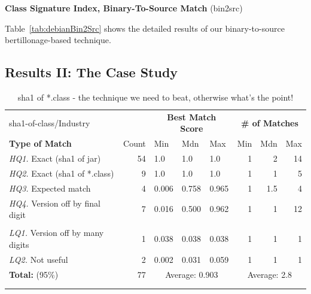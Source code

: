 \textbf{Class Signature Index, Binary-To-Source Match} (bin2src)

Table~\ref{tab:debianBin2Src} shows the detailed results of our binary-to-source
bertillonage-based technique.




\subsection{Results II:  The Case Study}


\begin{table}[h]
  \centering
\begin{tabular}[htbp]{l|r|lll|rrr}
  sha1-of-class/Industry     &              & \multicolumn{3}{c|}{\textbf{Best Match Score}}  & \multicolumn{3}{c}{\textbf{\# of Matches}} \\
  \textbf{Type of Match}     & Count        & Min   & Mdn    & Max   & Min  & Mdn  & Max  \\
  \hline
  \emph{HQ1.} Exact (sha1 of jar)        & 54           & 1.0   & 1.0    & 1.0   & 1    & 2    & 14   \\
  \emph{HQ2.} Exact (sha1 of *.class)    &  9           & 1.0   & 1.0    & 1.0   & 1    & 1    &  5   \\
  \emph{HQ3.} Expected match             &  4           & 0.006 & 0.758  & 0.965 & 1    & 1.5  &  4   \\
  \emph{HQ4.} Version off by final digit &  7           & 0.016 & 0.500  & 0.962 & 1    & 1    & 12   \\
  & & & & & & & \\
  \emph{LQ1.} Version off by many digits &  1           & 0.038 & 0.038  & 0.038 & 1    & 1    &  1   \\
  \emph{LQ2.} Not useful                 &  2           & 0.002 & 0.031  & 0.059 & 1    & 1    &  1   \\
  \hline
  \textbf{Total:} \hspace{8em}    (95\%) &  77   & \multicolumn{3}{c|}{Average: 0.903}  & \multicolumn{3}{c}{Average: 2.8} \\
  & & & & & & & \\
  & & & & & & & \\

\end{tabular}
  \caption{sha1 of *.class - the technique we need to beat, otherwise what's the point!}
  \label{tab:bankSha1OfClass}
\end{table}


